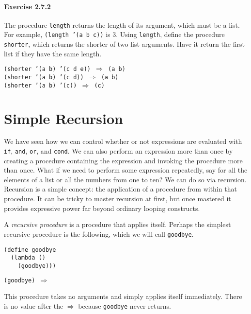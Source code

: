 \paragraph{Exercise \label{start_g31}2.7.2}


\label{start_s128}\label{start_EXSHORTER1}The procedure \texttt{length} returns the length of its argument, which
must be a list.
For example, \texttt{(length '(a b c))} is 3.
Using \texttt{length}, define the procedure \label{start_s129}\texttt{shorter}, which returns the
shorter of two list arguments.
Have it return the first list if they have the same length.


\begin{alltt}
(shorter '(a b) '(c d e)) \(\Rightarrow\) (a b)
(shorter '(a b) '(c d)) \(\Rightarrow\) (a b)
(shorter '(a b) '(c)) \(\Rightarrow\) (c)
\end{alltt}



\section{\label{start_g32}\label{start_h8}Simple Recursion\label{start_SECTGSRECURSION}}



\label{start_s130}We have seen how we can control whether or not
expressions are evaluated with \texttt{if}, \texttt{and}, \texttt{or},
and \texttt{cond}.
We can also perform an expression more than once by creating a
procedure containing the expression and invoking the procedure
more than once.
What if we need to perform some expression repeatedly, say for
all the elements of a list or all the numbers from one to ten?
We can do so via \label{start_s131}recursion.
Recursion is a simple concept: the application of a procedure from
within that procedure.
It can be tricky to master recursion at first, but once mastered it
provides expressive power far beyond ordinary looping constructs.


A \label{start_s132}\textit{recursive procedure} is a procedure that applies itself.
Perhaps the simplest recursive procedure is the following, which we will
call \label{start_s133}\texttt{goodbye}.


\begin{alltt}
(define goodbye
  (lambda ()
    (goodbye)))

(goodbye) \(\Rightarrow\)
\end{alltt}


This procedure takes no arguments and simply applies itself immediately.
There is no value after the \(\Rightarrow\) because \texttt{goodbye} never returns.


